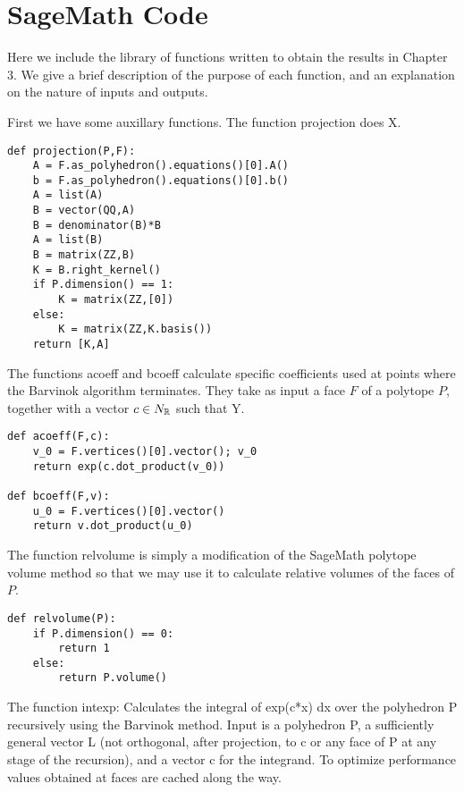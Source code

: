 \chapter{SageMath Code}

\lstset{language=Python} 


Here we include the library of functions written to obtain the results in Chapter 3. We give a brief description of the purpose of each function, and an explanation on the nature of inputs and outputs.

First we have some auxillary functions. The function projection does X.
\begin{lstlisting}
def projection(P,F):
    A = F.as_polyhedron().equations()[0].A()
    b = F.as_polyhedron().equations()[0].b()
    A = list(A)
    B = vector(QQ,A)
    B = denominator(B)*B
    A = list(B)
    B = matrix(ZZ,B)
    K = B.right_kernel()
    if P.dimension() == 1:
        K = matrix(ZZ,[0])
    else:
        K = matrix(ZZ,K.basis())
    return [K,A]
\end{lstlisting}

The functions acoeff and bcoeff calculate specific coefficients used at points where the Barvinok algorithm terminates. They take as input a face \(F\) of a polytope \(P\), together with a vector \(c \in N_{\mathbb{R}}\) such that Y.
\begin{lstlisting}
def acoeff(F,c):
    v_0 = F.vertices()[0].vector(); v_0
    return exp(c.dot_product(v_0))

def bcoeff(F,v):
    u_0 = F.vertices()[0].vector()
    return v.dot_product(u_0)
\end{lstlisting}
The function relvolume is simply a modification of the SageMath polytope volume method so that we may use it to calculate relative volumes of the faces of \(P\).
\begin{lstlisting}
def relvolume(P):
    if P.dimension() == 0:
        return 1
    else:
        return P.volume()
\end{lstlisting}

The function intexp:
Calculates the integral of exp(c*x) dx over the polyhedron P recursively using the Barvinok method. Input is a polyhedron P,
a sufficiently general vector L (not orthogonal, after projection, to c or any face of P at any stage of the recursion),
and a vector c for the integrand. To optimize performance values obtained at faces are cached along the way.



